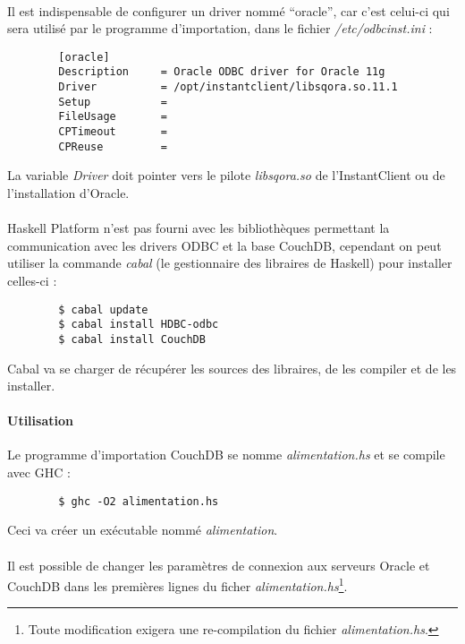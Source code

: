 \documentclass[a4paper,12pt,french]{article}
\begin{document}
    \paragraph{}
    Il est indispensable de configurer un driver nommé \enquote{oracle}, car
c'est celui-ci qui sera utilisé par le programme d'importation, dans le fichier
\textit{/etc/odbcinst.ini} :
    \begin{lstlisting}
        [oracle]
        Description     = Oracle ODBC driver for Oracle 11g
        Driver          = /opt/instantclient/libsqora.so.11.1
        Setup           =
        FileUsage       =
        CPTimeout       =
        CPReuse         = 
    \end{lstlisting}
    La variable \textit{Driver} doit pointer vers le pilote \textit{libsqora.so}
de l'InstantClient ou de l'installation d'Oracle.

    \paragraph{}
    Haskell Platform n'est pas fourni avec les bibliothèques permettant la
communication avec les drivers ODBC et la base CouchDB,  cependant on peut
utiliser la commande \textit{cabal} (le gestionnaire des libraires de Haskell)
pour installer celles-ci :
    \begin{lstlisting}
        $ cabal update
        $ cabal install HDBC-odbc
        $ cabal install CouchDB
    \end{lstlisting}
    Cabal va se charger de récupérer les sources des libraires, de les compiler
et de les installer.

    \paragraph{Utilisation}
    Le programme d'importation CouchDB se nomme \textit{alimentation.hs} et se
compile avec GHC :
    \begin{lstlisting}
        $ ghc -O2 alimentation.hs
    \end{lstlisting}
    Ceci va créer un exécutable nommé \textit{alimentation}.

    \paragraph{}
    Il est possible de changer les paramètres de connexion aux serveurs
Oracle et CouchDB dans les premières lignes du ficher
\textit{alimentation.hs}\footnote{Toute modification exigera une re-compilation
du fichier \textit{alimentation.hs}.}.
    
\end{document}
